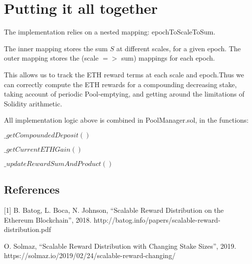 \documentclass[reqno]{article}
\begin{document}
\bigskip
\section{Putting it all together}

\bigskip
The implementation relies on a nested mapping: epochToScaleToSum. 

\bigskip
The inner mapping stores the sum {$S$} at different scales, for a given epoch. The outer mapping stores the (scale $=>$ sum) mappings for each epoch.

\bigskip
This allows us to track the ETH reward terms at each scale and epoch.Thus we can correctly compute the ETH rewards for a compounding decreasing stake, taking account of periodic Pool-emptying, and getting around the limitations of Solidity arithmetic.

\bigskip
All implementation logic above is combined in PoolManager.sol, in the functions:

\bigskip
$\_getCompoundedDeposit()$

$\_getCurrentETHGain()$

$\_updateRewardSumAndProduct()$

\bigskip
\subsection*{References}

[1]  B. Batog, L. Boca, N. Johnson, “Scalable Reward Distribution on the Ethereum Blockchain”, 2018. 
http://batog.info/papers/scalable-reward-distribution.pdf

\bigskip
[2] O. Solmaz, “Scalable Reward Distribution with Changing Stake Sizes”, 2019.
https://solmaz.io/2019/02/24/scalable-reward-changing/
\end{document}
